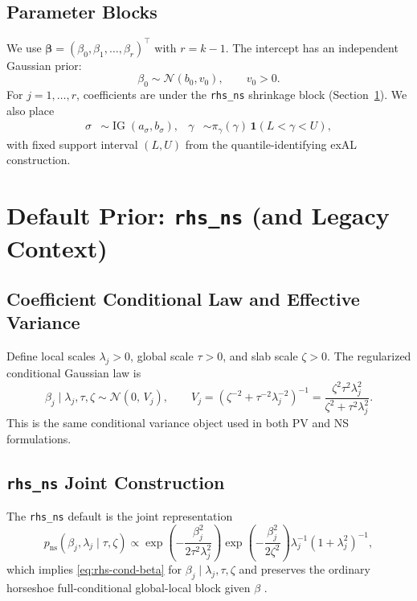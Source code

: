 \documentclass[11pt]{article}
\newcommand{\N}{\mathcal{N}}
\newcommand{\vect}[1]{\bm{#1}}
\DeclareMathOperator{\IG}{IG}
\begin{document}
\subsection{Parameter Blocks}

We use $\vect{\beta}=(\beta_0,\beta_1,\dots,\beta_r)^\top$ with $r=k-1$.
The intercept has an independent Gaussian prior:
\begin{equation}
  \beta_0 \sim \N(b_0,v_0), \qquad v_0>0.
\end{equation}
For $j=1,\dots,r$, coefficients are under the \texttt{rhs\_ns} shrinkage block (Section~\ref{sec:rhs-ns}).
We also place
\begin{align}
  \sigma &\sim \IG(a_\sigma,b_\sigma),
  &
  \gamma &\sim \pi_\gamma(\gamma)\,\mathbf{1}(L<\gamma<U),
\end{align}
with fixed support interval $(L,U)$ from the quantile-identifying exAL construction.

\section{Default Prior: \texttt{rhs\_ns} (and Legacy Context)}
\label{sec:rhs-ns}

\subsection{Coefficient Conditional Law and Effective Variance}

Define local scales $\lambda_j>0$, global scale $\tau>0$, and slab scale $\zeta>0$.
The regularized conditional Gaussian law is
\begin{equation}
  \beta_j\mid\lambda_j,\tau,\zeta
  \sim \N\!\left(0,\,V_j\right),
  \qquad
  V_j = \left(\zeta^{-2}+\tau^{-2}\lambda_j^{-2}\right)^{-1}
      = \frac{\zeta^2\tau^2\lambda_j^2}{\zeta^2+\tau^2\lambda_j^2}.
  \label{eq:rhs-cond-beta}
\end{equation}
This is the same conditional variance object used in both PV and NS formulations.

\subsection{\texttt{rhs\_ns} Joint Construction}

The \texttt{rhs\_ns} default is the joint representation
\begin{equation}
  p_{\mathrm{ns}}(\beta_j,\lambda_j\mid\tau,\zeta)
  \propto
  \exp\!\left(-\frac{\beta_j^2}{2\tau^2\lambda_j^2}\right)
  \exp\!\left(-\frac{\beta_j^2}{2\zeta^2}\right)
  \lambda_j^{-1}(1+\lambda_j^2)^{-1},
  \label{eq:ns-joint-product}
\end{equation}
which implies \eqref{eq:rhs-cond-beta} for $\beta_j\mid\lambda_j,\tau,\zeta$ and preserves the ordinary horseshoe
full-conditional global-local block given $\beta$ \cite{nishimura-suchard}.
\end{document}
